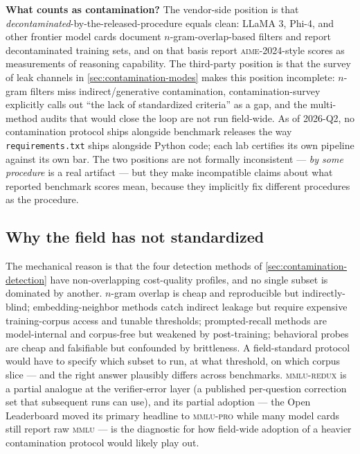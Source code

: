 \begin{contradiction}
\textbf{What counts as contamination?} The vendor-side position is
that \emph{decontaminated}-by-the-released-procedure equals clean:
LLaMA 3, Phi-4, and other frontier model cards document
$n$-gram-overlap-based filters and report decontaminated training
sets, and on that basis report \textsc{aime}-2024-style scores as
measurements of reasoning capability. The third-party position is
that the survey of leak channels in \cref{sec:contamination-modes}
makes this position incomplete: $n$-gram filters miss
indirect/generative contamination, contamination-survey
\citep[\S{}abstract]{contamination-survey-2025} explicitly calls out
``the lack of standardized criteria'' as a gap, and the
multi-method audits that would close the loop are not run
field-wide. As of 2026-Q2, no contamination protocol ships alongside
benchmark releases the way \texttt{requirements.txt} ships alongside
Python code; each lab certifies its own pipeline against its own bar.
The two positions are not formally inconsistent --- 
\emph{by some procedure} is a real artifact --- but they make
incompatible claims about what reported benchmark scores mean,
because they implicitly fix different procedures as the procedure.
\end{contradiction}

\subsection{Why the field has not standardized}
\label{sec:contamination-no-standard}

The mechanical reason is that the four detection methods of
\cref{sec:contamination-detection} have non-overlapping cost-quality
profiles, and no single subset is dominated by another. $n$-gram
overlap is cheap and reproducible but indirectly-blind;
embedding-neighbor methods catch indirect leakage but require
expensive training-corpus access and tunable thresholds;
prompted-recall methods are model-internal and corpus-free but
weakened by post-training; behavioral probes are cheap and
falsifiable but confounded by brittleness. A field-standard protocol
would have to specify which subset to run, at what threshold, on
which corpus slice --- and the right answer plausibly differs across
benchmarks. \textsc{mmlu-redux} \citep{mmlu-redux-2024} is a partial
analogue at the verifier-error layer (a published per-question
correction set that subsequent runs can use), and its partial
adoption --- the Open  Leaderboard moved its primary headline to
\textsc{mmlu-pro} while many model cards still report raw \textsc{mmlu}
\citep[\S{}implications]{mmlu-redux-2024} --- is the diagnostic for
how field-wide adoption of a heavier contamination protocol would
likely play out.

